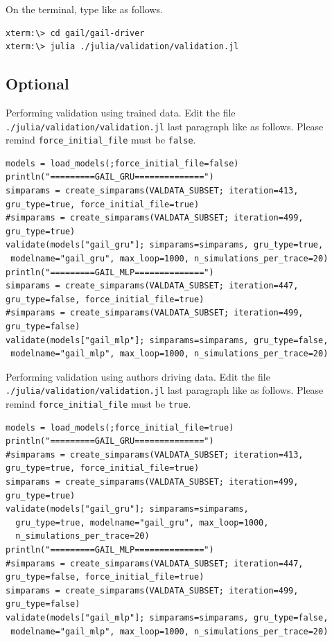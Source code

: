 \documentclass[openany,11pt]{report}%
\begin{document}
On the terminal, type like as follows.

\begin{lstlisting}[style=DOS]
xterm:\> cd gail/gail-driver
xterm:\> julia ./julia/validation/validation.jl
\end{lstlisting}

\begin{landscape}
\subsection{Optional}

Performing validation using trained data.
Edit the file {\tt ./julia/validation/validation.jl} last paragraph like as follows.
Please remind {\tt force\_initial\_file} must be {\tt false}. 
\begin{lstlisting}[style=DOS]
models = load_models(;force_initial_file=false) 
println("=========GAIL_GRU==============")
simparams = create_simparams(VALDATA_SUBSET; iteration=413, gru_type=true, force_initial_file=true)
#simparams = create_simparams(VALDATA_SUBSET; iteration=499, gru_type=true)
validate(models["gail_gru"]; simparams=simparams, gru_type=true, 
 modelname="gail_gru", max_loop=1000, n_simulations_per_trace=20)
println("=========GAIL_MLP==============")
simparams = create_simparams(VALDATA_SUBSET; iteration=447, gru_type=false, force_initial_file=true)
#simparams = create_simparams(VALDATA_SUBSET; iteration=499, gru_type=false)
validate(models["gail_mlp"]; simparams=simparams, gru_type=false,  
 modelname="gail_mlp", max_loop=1000, n_simulations_per_trace=20)
\end{lstlisting}
\end{landscape}

\begin{landscape}
Performing validation using authors driving data.
Edit the file {\tt ./julia/validation/validation.jl} last paragraph like as follows.
Please remind {\tt force\_initial\_file} must be {\tt true}. 
\begin{lstlisting}[style=DOS]
models = load_models(;force_initial_file=true)
println("=========GAIL_GRU==============")
#simparams = create_simparams(VALDATA_SUBSET; iteration=413, gru_type=true, force_initial_file=true)
simparams = create_simparams(VALDATA_SUBSET; iteration=499, gru_type=true)
validate(models["gail_gru"]; simparams=simparams, 
  gru_type=true, modelname="gail_gru", max_loop=1000,  
  n_simulations_per_trace=20)
println("=========GAIL_MLP==============")
#simparams = create_simparams(VALDATA_SUBSET; iteration=447, gru_type=false, force_initial_file=true)
simparams = create_simparams(VALDATA_SUBSET; iteration=499, gru_type=false)
validate(models["gail_mlp"]; simparams=simparams, gru_type=false,  
 modelname="gail_mlp", max_loop=1000, n_simulations_per_trace=20)
\end{lstlisting}
\end{landscape}
\end{document}
